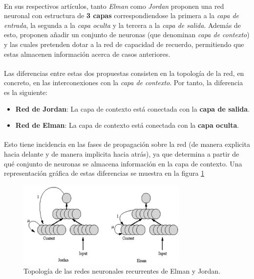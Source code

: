 \documentclass[10pt, a4paper,spanish]{article}
\begin{document}
		\paragraph{}
		En sus respectivos artículos, tanto \emph{Elman} como \emph{Jordan} proponen una red neuronal con estructura de \textbf{3 capas} correspondiendose la primera a la \emph{capa de entrada}, la segunda a la \emph{capa oculta} y la tercera a la \emph{capa de salida}. Además de esto, proponen añadir un conjunto de neuronas (que denominan \emph{capa de contexto}) y las cuales pretenden dotar a la red de capacidad de recuerdo, permitiendo que estas almacenen información acerca de casos anteriores.

		\paragraph{}
		Las diferencias entre estas dos propuestas consisten en la topología de la red, en concreto, en las interconexiones con la \emph{capa de contexto}. Por tanto, la diferencia es la siguiente:

		\begin{itemize}
			\item \textbf{Red de Jordan}: La capa de contexto está conectada con la \textbf{capa de salida}.
			\item \textbf{Red de Elman}: La capa de contexto está conectada con la \textbf{capa oculta}.
		\end{itemize}

		\paragraph{}
		Esto tiene incidencia en las fases de propagación sobre la red (de manera explicita hacia delante y de manera implicita hacia atrás), ya que determina a partir de qué conjunto de neuronas se almacena información en la capa de contexto. Una representación gráfica de estas diferencias se muestra en la figura \ref{fig:topology}

		\begin{figure}[htpb!]
			\begin{center}
				\includegraphics[width=0.75\textwidth]{topology}
						\caption{Topología de las redes neuronales recurrentes de Elman y Jordan.}
						\label{fig:topology}
				\end{center}
		\end{figure}
\end{document}
